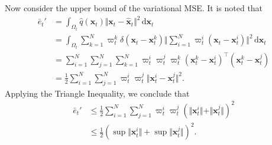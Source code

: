\documentclass[10pt,twocolumn,twoside]{IEEEtran}
\newcommand{\fs}{\text{.}} %
\newcommand{\x}{{ \bm{x} }}
\begin{document}
\begin{appendices}
Now consider the upper bound of the variational MSE. It is noted that
\begin{equation*}
\begin{split}
    \bar{e}_t' &= \int_{\Omega_t}{\hat{q}(\x_t)\Vert\x_t-\hat\x_t\Vert^2}\,\mathrm{d}\x_t \\
    &= \int_{\Omega_t}{\sum_{k=1}^N\varpi_t^k\delta(\x_t-\x_t^k)\Big\Vert\sum_{i=1}^N\varpi_t^i(\x_t-\x_t^i)\Big\Vert^2}\,\mathrm{d}\x_t \\
    &= \sum_{i=1}^N\sum_{j=1}^N\sum_{k=1}^N\varpi_t^i\varpi_t^j\varpi_t^k(\x_t^k-\x_t^i)^\top(\x_t^k-\x_t^j) \\
    &= \frac{1}{2}\sum_{i=1}^N\sum_{j=1}^N\varpi_t^i\varpi_t^j\Vert\x_t^i-\x_t^j\Vert^2 \fs
\end{split}
\end{equation*}
Applying the Triangle Inequality, we conclude that
\begin{equation} \label{ineq2}
\begin{split}
    \bar{e}_t' &\leq \frac{1}{2}\sum_{i=1}^N\sum_{j=1}^N\varpi_t^i\varpi_t^j(\Vert\x_t^i\Vert+\Vert\x_t^j\Vert)^2 \\
    &\leq \frac{1}{2}(\sup\Vert\x_t^i\Vert+\sup\Vert\x_t^j\Vert)^2 \fs
\end{split}
\end{equation}


\end{appendices}
\end{document}
